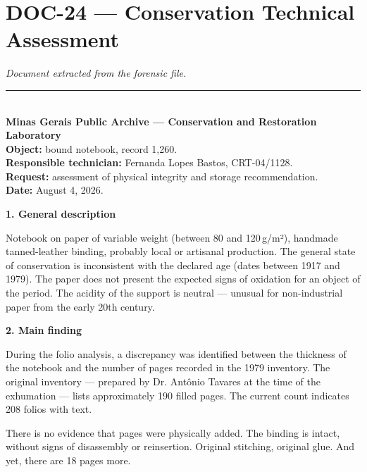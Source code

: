 \section*{\textbf{DOC-24} --- Conservation Technical Assessment}

\noindent \textit{Document extracted from the forensic file.}

\vspace{0.5em}\noindent\rule{\textwidth}{0.5pt}\vspace{0.5em}

\\[-0.2em]

\noindent \textbf{Minas Gerais Public Archive --- Conservation and Restoration Laboratory}\\
\noindent \textbf{Object:} bound notebook, record 1,260.\\
\noindent \textbf{Responsible technician:} Fernanda Lopes Bastos, CRT-04/1128.\\
\noindent \textbf{Request:} assessment of physical integrity and storage recommendation.\\
\noindent\textbf{Date:} August 4, 2026.

\noindent \textbf{1. General description}

\noindent Notebook on paper of variable weight (between 80 and 120\,g/m²), handmade tanned-leather binding, probably local or artisanal production. The general state of conservation is inconsistent with the declared age (dates between 1917 and 1979). The paper does not present the expected signs of oxidation for an object of the period. The acidity of the support is neutral --- unusual for non-industrial paper from the early 20th century.

\noindent \textbf{2. Main finding}

\noindent During the folio analysis, a discrepancy was identified between the thickness of the notebook and the number of pages recorded in the 1979 inventory. The original inventory --- prepared by Dr. Antônio Tavares at the time of the exhumation --- lists approximately 190 filled pages. The current count indicates 208 folios with text.

\noindent There is no evidence that pages were physically added. The binding is intact, without signs of disassembly or reinsertion. Original stitching, original glue. And yet, there are 18 pages more.

